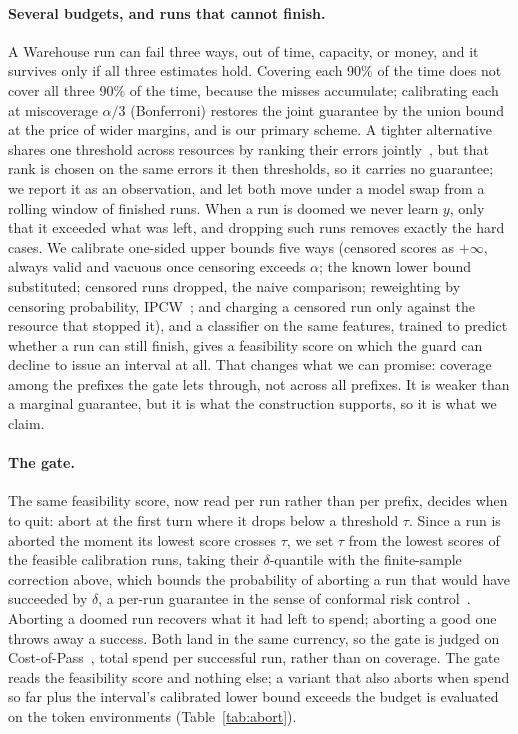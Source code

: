 \documentclass{article}
\begin{document}
\paragraph{Several budgets, and runs that cannot finish.}
A Warehouse run can fail three ways, out of time, capacity, or money, and it survives only if all three estimates hold. Covering each 90\% of the time does not cover all three 90\% of the time, because the misses accumulate; calibrating each at miscoverage $\alpha/3$ (Bonferroni) restores the joint guarantee by the union bound at the price of wider margins, and is our primary scheme. A tighter alternative shares one threshold across resources by ranking their errors jointly~\cite{messoudi2021copula}, but that rank is chosen on the same errors it then thresholds, so it carries no guarantee; we report it as an observation, and let both move under a model swap from a rolling window of finished runs. When a run is doomed we never learn $y$, only that it exceeded what was left, and dropping such runs removes exactly the hard cases. We calibrate one-sided upper bounds five ways (censored scores as $+\infty$, always valid and vacuous once censoring exceeds $\alpha$; the known lower bound substituted; censored runs dropped, the naive comparison; reweighting by censoring probability, IPCW~\cite{robins1992recovery,gui2024conformalized}; and charging a censored run only against the resource that stopped it), and a classifier on the same features, trained to predict whether a run can still finish, gives a feasibility score on which the guard can decline to issue an interval at all. That changes what we can promise: coverage among the prefixes the gate lets through, not across all prefixes. It is weaker than a marginal guarantee, but it is what the construction supports, so it is what we claim.

\paragraph{The gate.}
The same feasibility score, now read per run rather than per prefix, decides when to quit: abort at the first turn where it drops below a threshold $\tau$. Since a run is aborted the moment its lowest score crosses $\tau$, we set $\tau$ from the lowest scores of the feasible calibration runs, taking their $\delta$-quantile with the finite-sample correction above, which bounds the probability of aborting a run that would have succeeded by $\delta$, a per-run guarantee in the sense of conformal risk control~\cite{angelopoulos2024crc}. Aborting a doomed run recovers what it had left to spend; aborting a good one throws away a success. Both land in the same currency, so the gate is judged on Cost-of-Pass~\cite{erol2026costofpass}, total spend per successful run, rather than on coverage. The gate reads the feasibility score and nothing else; a variant that also aborts when spend so far plus the interval's calibrated lower bound exceeds the budget is evaluated on the token environments (Table~\ref{tab:abort}).
\end{document}
